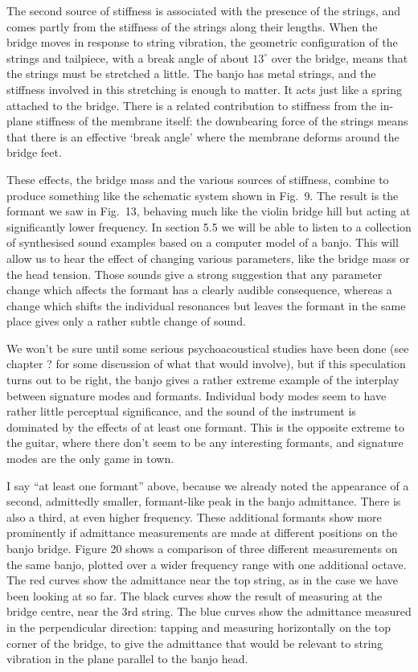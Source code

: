   The second source of stiffness is associated with the presence of the 
  strings, and comes partly from the stiffness of the strings along their 
  lengths. When the bridge moves in response to string vibration, the geometric 
  configuration of the strings and tailpiece, with a break angle of about 
  $13^\circ$ over the bridge, means that the strings must be stretched a 
  little. The banjo has metal strings, and the stiffness involved in this 
  stretching is enough to matter. It acts just like a spring attached to the 
  bridge. There is a related contribution to stiffness from the in-plane 
  stiffness of the membrane itself: the downbearing force of the strings means 
  that there is an effective `break angle' where the membrane deforms around 
  the bridge feet. 

  These effects, the bridge mass and the various sources of stiffness, combine 
  to produce something like the schematic system shown in Fig.\ 9. The result 
  is the formant we saw in Fig.\ 13, behaving much like the violin bridge hill 
  but acting at significantly lower frequency. In section 5.5 we will be able 
  to listen to a collection of synthesised sound examples based on a computer 
  model of a banjo. This will allow us to hear the effect of changing various 
  parameters, like the bridge mass or the head tension. Those sounds give a 
  strong suggestion that any parameter change which affects the formant has a 
  clearly audible consequence, whereas a change which shifts the individual 
  resonances but leaves the formant in the same place gives only a rather 
  subtle change of sound. 

  We won't be sure until some serious psychoacoustical studies have been done 
  (see chapter ? for some discussion of what that would involve), but if this 
  speculation turns out to be right, the banjo gives a rather extreme example 
  of the interplay between signature modes and formants. Individual body modes 
  seem to have rather little perceptual significance, and the sound of the 
  instrument is dominated by the effects of at least one formant. This is the 
  opposite extreme to the guitar, where there don't seem to be any interesting 
  formants, and signature modes are the only game in town. 

  I say ``at least one formant'' above, because we already noted the appearance 
  of a second, admittedly smaller, formant-like peak in the banjo admittance. 
  There is also a third, at even higher frequency. These additional formants 
  show more prominently if admittance measurements are made at different 
  positions on the banjo bridge. Figure 20 shows a comparison of three 
  different measurements on the same banjo, plotted over a wider frequency 
  range with one additional octave. The red curves show the admittance near the 
  top string, as in the case we have been looking at so far. The black curves 
  show the result of measuring at the bridge centre, near the 3rd string. The 
  blue curves show the admittance measured in the perpendicular direction: 
  tapping and measuring horizontally on the top corner of the bridge, to give 
  the admittance that would be relevant to string vibration in the plane 
  parallel to the banjo head. 

